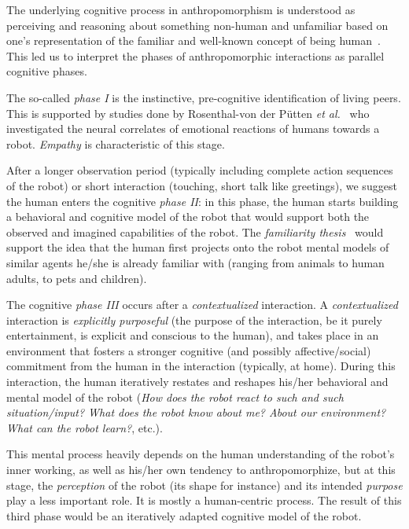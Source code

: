 \documentclass{sig-alternate-2013}
\begin{document}
The underlying cognitive process in anthropomorphism is understood as
perceiving and reasoning about something non-human and unfamiliar based on
one's representation of the familiar and well-known concept of being
human~\cite{epley_when_2008}. This led us to interpret the phases of
anthropomorphic interactions as parallel cognitive phases.

The so-called \emph{phase I} is the instinctive, pre-cognitive identification
of living peers. This is supported by studies done by Rosenthal-von der Pütten
\textit{et al.}~\cite{rosenthal-vonderputten_experimental_2013} who
investigated the neural correlates of emotional reactions of humans towards a
robot. {\it Empathy} is characteristic of this stage.

After a longer observation period (typically including complete action
sequences of the robot) or short interaction (touching, short talk like
greetings), we suggest the human enters the cognitive \emph{phase II}: in this
phase, the human starts building a behavioral and cognitive model of the robot
that would support both the observed and imagined capabilities of the robot.
The \emph{familiarity thesis}~\cite{hegel_understanding_2008} would support the
idea that the human first projects onto the robot mental models of similar
agents he/she is already familiar with (ranging from animals to human adults,
to pets and children).

The cognitive \emph{phase III} occurs after a \emph{contextualized}
interaction. A \emph{contextualized} interaction is \emph{explicitly
purposeful} (the purpose of the interaction, be it purely entertainment, is
explicit and conscious to the human), and takes place in an environment that
fosters a stronger cognitive (and possibly affective/social) commitment from
the human in the interaction (typically, at home). During this interaction, the
human iteratively restates and reshapes his/her behavioral and mental model of
the robot (\emph{How does the robot react to such and such situation/input?
What does the robot know about me? About our environment? What
can the robot learn?}, etc.).

This mental process heavily depends on the human understanding of the robot's
inner working, as well as his/her own tendency to anthropomorphize, but at this
stage, the \emph{perception} of the robot (its shape for instance) and its
intended \emph{purpose} play a less important role. It is mostly a
human-centric process.  The result of this third phase would be an iteratively
adapted cognitive model of the robot.
\end{document}
